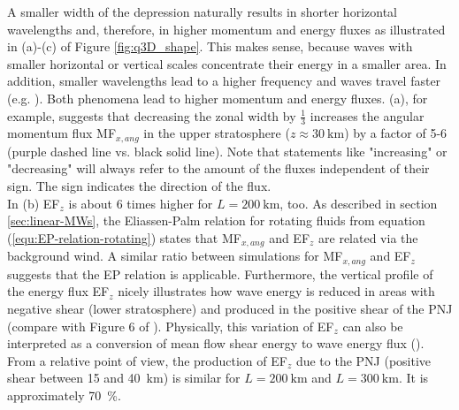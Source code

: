 A smaller width of the depression naturally results in shorter horizontal wavelengths and, therefore, in higher momentum and energy fluxes as illustrated in (a)-(c) of Figure \ref{fig:q3D_shape}. This makes sense, because waves with smaller horizontal or vertical scales concentrate their energy in a smaller area. In addition, smaller wavelengths lead to a higher frequency and waves travel faster (e.g. \cite[]{gill_atmosphere-ocean_1982}). Both phenomena lead to higher momentum and energy fluxes. (a), for example, suggests that decreasing the zonal width by $\frac{1}{3}$ increases the angular momentum flux MF$_{x,ang}$ in the upper stratosphere ($z \approx \SI{30}{\kilo\meter}$) by a factor of 5-6 (purple dashed line vs. black solid line). Note that statements like "increasing" or "decreasing" will always refer to the amount of the fluxes independent of their sign. The sign indicates the direction of the flux. \\
In (b) EF$_z$ is about 6 times higher for $L=\SI{200}{\kilo\meter}$, too. As described in section \ref{sec:linear-MWs}, the Eliassen-Palm relation for rotating fluids from equation (\ref{equ:EP-relation-rotating}) states that MF$_{x,ang}$ and EF$_z$ are related via the background wind. A similar ratio between simulations for MF$_{x,ang}$ and EF$_z$ suggests that the EP relation is applicable. Furthermore, the vertical profile of the energy flux EF$_z$ nicely illustrates how wave energy is reduced in areas with negative shear (lower stratosphere) and produced in the positive shear of the PNJ (compare with Figure 6 of \textcite[]{eliassen_transfer_1960}). Physically, this variation of EF$_z$ can also be interpreted as a conversion of mean flow shear energy to wave energy flux (\cite[]{kruse_gravity_2015}). From a relative point of view, the production of EF$_z$ due to the PNJ (positive shear between 15 and \SI{40}{\kilo\meter}) is similar for $L=\SI{200}{\kilo\meter}$ and $L=\SI{300}{\kilo\meter}$. It is approximately \SI{70}{\percent}.


